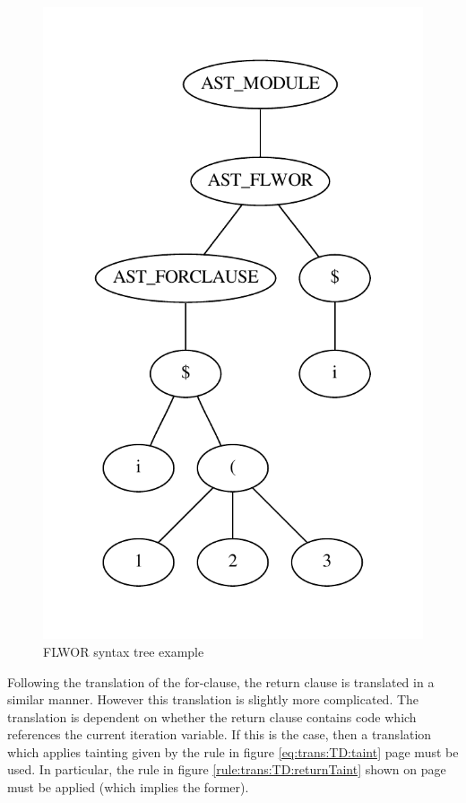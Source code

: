 \begin{figure}[!htp]
\begin{center}
  \includegraphics[scale=0.4]{img/graphs/flwor2}
  \caption{FLWOR syntax tree example}
  \label{fig:impl:td:flwor2}
\end{center}
\end{figure}

Following the translation of the for-clause, the return clause is translated in
a similar manner. However this translation is slightly more complicated. The
translation is dependent on whether the return clause contains code which
references the current iteration variable. If this is the case, then a
translation which applies tainting given by the rule in figure
\ref{eq:trans:TD:taint} page \pageref{eq:trans:TD:taint} must be used. In
particular, the rule in figure \ref{rule:trans:TD:returnTaint} shown on page
\pageref{rule:trans:TD:returnTaint} must be applied (which implies the former).

